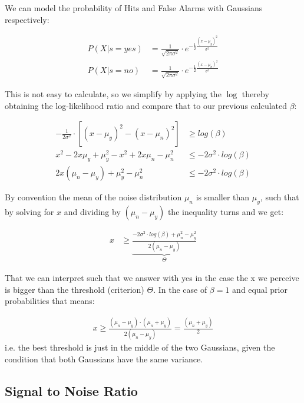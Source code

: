 \documentclass[../main/Notes.tex]{subfiles}
\begin{document}
We can model the probability of Hits and False Alarms with Gaussians respectively:

\begin{align*}
  P\left(X|s=yes\right) &= \frac{1}{\sqrt{2\pi \sigma^2}} \cdot e^{-\frac{1}{2}\frac{\left(x-\mu_y\right)^2}{\sigma^2}}\\
  P\left(X|s=no\right) &= \frac{1}{\sqrt{2\pi \sigma^2}} \cdot e^{-\frac{1}{2}\frac{\left(x-\mu_n\right)^2}{\sigma^2}}
\end{align*}

This is not easy to calculate, so we simplify by applying the $\log$ thereby obtaining the log-likelihood ratio and compare that to our previous calculated $\beta$:

\begin{align*}
 -\frac{1}{2\sigma^2} \cdot \left[\left(x-\mu_y\right)^2 - \left(x-\mu_n\right)^2 \right] &\geq log\left(\beta\right)\\
  x^2 - 2x\mu_y + \mu_{y}^{2} - x^2 + 2x\mu_n - \mu_{n}^{2} &\leq -2\sigma^2 \cdot log\left(\beta\right)\\
  2x\left(\mu_n - \mu_y\right)+\mu_{y}^{2}-\mu_{n}^{2}&\leq -2\sigma^2\cdot log\left(\beta\right)\end{align*}
  
By convention the mean of the noise distribution $\mu_n$ is smaller than $\mu_y$, such that by solving for $x$ and dividing by $\left(\mu_n-\mu_y\right)$ the inequality turns and we get:

\begin{align*}
  x  &\geq \underbrace{\frac{-2\sigma^2 \cdot log\left(\beta\right) + \mu_{n}^{2}-\mu_{y}^{2}}{2\left(\mu_n-\mu_y\right)}}_{\Theta}
\end{align*}

That we can interpret such that we answer with yes in the case the x we perceive is bigger than the threshold (criterion) $\Theta$.
In the case of $\beta = 1$ and equal prior probabilities that means:

\begin{align*}
  x \geq \frac{\left(\mu_n-\mu_y\right)\cdot \left(\mu_n+\mu_y\right)}{2\left(\mu_n-\mu_y\right)} = \frac{\left(\mu_n+\mu_y\right)}{2} 
\end{align*}
i.e. the best threshold is just in the middle of the two Gaussians, given the condition that both Gaussians have the same variance.

\newpage

\subsection{Signal to Noise Ratio}
\end{document}
